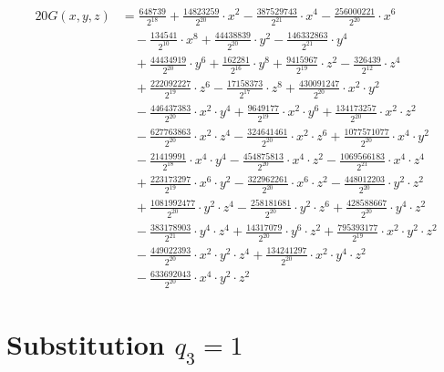 \begin{align*}20G(x,y,z)&=\frac{648739}{2^{18}}+\frac{14823259}{2^{20}}\cdot x^{2}-\frac{387529743}{2^{21}}\cdot x^{4}-\frac{256000221}{2^{20}}\cdot x^{6}\\
&\quad -\frac{134541}{2^{10}}\cdot x^{8}+\frac{44438839}{2^{20}}\cdot y^{2}-\frac{146332863}{2^{21}}\cdot y^{4}\\
&\quad +\frac{44434919}{2^{20}}\cdot y^{6}+\frac{162281}{2^{16}}\cdot y^{8}+\frac{9415967}{2^{19}}\cdot z^{2}-\frac{326439}{2^{12}}\cdot z^{4}\\
&\quad +\frac{222092227}{2^{19}}\cdot z^{6}-\frac{17158373}{2^{17}}\cdot z^{8}+\frac{430091247}{2^{20}}\cdot x^{2}\cdot y^{2}\\
&\quad -\frac{446437383}{2^{20}}\cdot x^{2}\cdot y^{4}+\frac{9649177}{2^{19}}\cdot x^{2}\cdot y^{6}+\frac{134173257}{2^{20}}\cdot x^{2}\cdot z^{2}\\
&\quad -\frac{627763863}{2^{20}}\cdot x^{2}\cdot z^{4}-\frac{324641461}{2^{20}}\cdot x^{2}\cdot z^{6}+\frac{1077571077}{2^{20}}\cdot x^{4}\cdot y^{2}\\
&\quad -\frac{21419991}{2^{18}}\cdot x^{4}\cdot y^{4}-\frac{454875813}{2^{20}}\cdot x^{4}\cdot z^{2}-\frac{1069566183}{2^{21}}\cdot x^{4}\cdot z^{4}\\
&\quad +\frac{223173297}{2^{19}}\cdot x^{6}\cdot y^{2}-\frac{322962261}{2^{20}}\cdot x^{6}\cdot z^{2}-\frac{448012203}{2^{20}}\cdot y^{2}\cdot z^{2}\\
&\quad +\frac{1081992477}{2^{20}}\cdot y^{2}\cdot z^{4}-\frac{258181681}{2^{20}}\cdot y^{2}\cdot z^{6}+\frac{428588667}{2^{20}}\cdot y^{4}\cdot z^{2}\\
&\quad -\frac{383178903}{2^{21}}\cdot y^{4}\cdot z^{4}+\frac{14317079}{2^{20}}\cdot y^{6}\cdot z^{2}+\frac{795393177}{2^{19}}\cdot x^{2}\cdot y^{2}\cdot z^{2}\\
&\quad -\frac{449022393}{2^{20}}\cdot x^{2}\cdot y^{2}\cdot z^{4}+\frac{134241297}{2^{20}}\cdot x^{2}\cdot y^{4}\cdot z^{2}\\
&\quad -\frac{633692043}{2^{20}}\cdot x^{4}\cdot y^{2}\cdot z^{2}\end{align*}\section{Substitution $q_3=1$}
